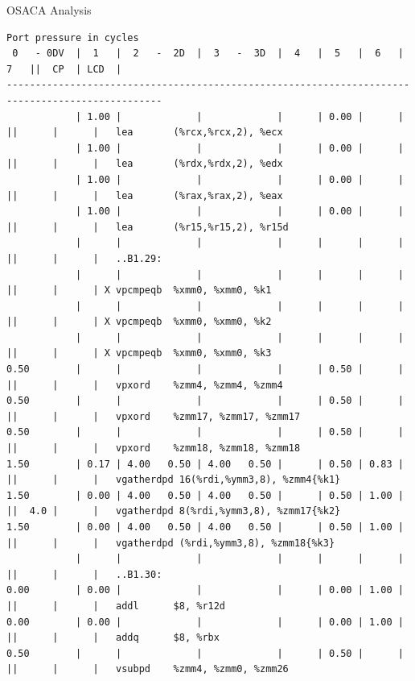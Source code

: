 \documentclass[aspectratio=169,t]{beamer}
\begin{document}
  \begin{frame}[fragile]{OSACA Analysis}
    \vspace{-20pt}
    \begin{lstlisting}[basicstyle=\tt\fontsize{4pt}{6pt}\selectfont]
                                     Port pressure in cycles
 0   - 0DV  |  1   |  2   -  2D  |  3   -  3D  |  4   |  5   |  6   |  7   ||  CP  | LCD  |
-------------------------------------------------------------------------------------------------
            | 1.00 |             |             |      | 0.00 |      |      ||      |      |   lea       (%rcx,%rcx,2), %ecx
            | 1.00 |             |             |      | 0.00 |      |      ||      |      |   lea       (%rdx,%rdx,2), %edx
            | 1.00 |             |             |      | 0.00 |      |      ||      |      |   lea       (%rax,%rax,2), %eax
            | 1.00 |             |             |      | 0.00 |      |      ||      |      |   lea       (%r15,%r15,2), %r15d
            |      |             |             |      |      |      |      ||      |      |   ..B1.29:
            |      |             |             |      |      |      |      ||      |      | X vpcmpeqb  %xmm0, %xmm0, %k1
            |      |             |             |      |      |      |      ||      |      | X vpcmpeqb  %xmm0, %xmm0, %k2
            |      |             |             |      |      |      |      ||      |      | X vpcmpeqb  %xmm0, %xmm0, %k3
0.50        |      |             |             |      | 0.50 |      |      ||      |      |   vpxord    %zmm4, %zmm4, %zmm4
0.50        |      |             |             |      | 0.50 |      |      ||      |      |   vpxord    %zmm17, %zmm17, %zmm17
0.50        |      |             |             |      | 0.50 |      |      ||      |      |   vpxord    %zmm18, %zmm18, %zmm18
1.50        | 0.17 | 4.00   0.50 | 4.00   0.50 |      | 0.50 | 0.83 |      ||      |      |   vgatherdpd 16(%rdi,%ymm3,8), %zmm4{%k1}
1.50        | 0.00 | 4.00   0.50 | 4.00   0.50 |      | 0.50 | 1.00 |      ||  4.0 |      |   vgatherdpd 8(%rdi,%ymm3,8), %zmm17{%k2}
1.50        | 0.00 | 4.00   0.50 | 4.00   0.50 |      | 0.50 | 1.00 |      ||      |      |   vgatherdpd (%rdi,%ymm3,8), %zmm18{%k3}
            |      |             |             |      |      |      |      ||      |      |   ..B1.30:
0.00        | 0.00 |             |             |      | 0.00 | 1.00 |      ||      |      |   addl      $8, %r12d
0.00        | 0.00 |             |             |      | 0.00 | 1.00 |      ||      |      |   addq      $8, %rbx
0.50        |      |             |             |      | 0.50 |      |      ||      |      |   vsubpd    %zmm4, %zmm0, %zmm26

\end{lstlisting}
\end{frame}
\end{document}
